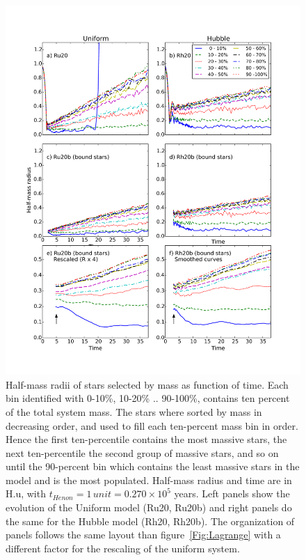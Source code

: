 \begin{figure}
\begin{center}
\includegraphics[width=\textwidth,clip=true]{Figures/3_Rhm_segr}
\caption{Half-mass radii of stars selected by mass as function of time. Each bin identified with 0-10\%, 10-20\% .. 90-100\%, contains ten percent of the total system mass. The stars where sorted by mass in decreasing order, and used to fill each ten-percent mass bin in order. Hence the first ten-percentile contains the most massive stars, the next ten-percentile the second group of massive stars, and so on until the 90-percent bin which contains the least massive stars in the model and is the most populated. Half-mass radius and time are in H.u, with $t_{Henon} = 1\,unit = 0.270 \times 10^5$ years. Left panels show the evolution of the Uniform model (Ru20, Ru20b) and right panels do the same for the Hubble model (Rh20, Rh20b). The organization of panels follows the same layout than figure~\ref{Fig:Lagrange} with a different factor for the rescaling of the uniform system. }
\label{Fig:3_Rhm_segr}
\end{center}
\end{figure}

